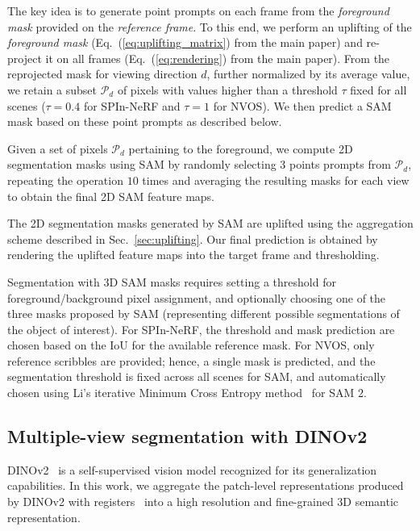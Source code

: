The key idea is to generate point prompts on each frame from the  \textit{foreground mask} provided on the \textit{reference frame}. To this end, we perform an uplifting of the \textit{foreground mask}  (Eq.~(\ref{eq:uplifting_matrix}) from the main paper) and re-project it on all frames (Eq.~(\ref{eq:rendering}) from the main paper).
From the reprojected mask for viewing direction $d$, further normalized by its average value, we retain a subset $\mathcal{P}_d$ of pixels with values higher than a threshold $\tau$ fixed for all scenes ($\tau=0.4$ for SPIn-NeRF and $\tau=1$ for NVOS).  
We then predict a SAM mask based on these point prompts as described below.

Given a set of pixels $\mathcal{P}_d$ pertaining to the foreground, we compute 2D segmentation masks using SAM by randomly selecting $3$ points prompts from $\mathcal{P}_d$, repeating the operation $10$ times and averaging the resulting masks for each view to obtain the final 2D SAM feature maps. 

 The 2D segmentation masks generated by SAM are uplifted using the aggregation scheme described in Sec.~\ref{sec:uplifting}. Our final prediction is obtained by rendering the uplifted feature maps into the target frame and thresholding.

Segmentation with 3D SAM masks requires setting a threshold for foreground/background pixel assignment, and optionally choosing one of the three masks proposed by SAM (representing different possible segmentations of the object of interest).
For SPIn-NeRF, the threshold and mask prediction are chosen based on the IoU for the available reference mask. For NVOS, only reference scribbles are provided; hence, a single mask is predicted, and the segmentation threshold is fixed across all scenes for SAM, and automatically chosen using Li's iterative Minimum Cross Entropy method~\citep{li1993minimum} for SAM 2.

\subsection{{Multiple-view} segmentation with DINOv2}\label{sec:appendix-dino_seg}

DINOv2~\citep{oquab2024dinov2} is a self-supervised vision model recognized for its generalization capabilities. 
In this work, we aggregate the patch-level representations produced by DINOv2 with registers~\citep{darcet2024registers} into a high resolution and fine-grained 3D semantic representation.  

